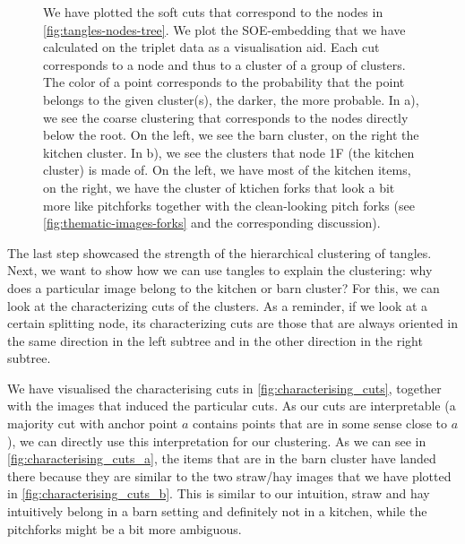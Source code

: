 \onecolumn
\begin{figure}[ht]
    \centering
    \hfill
    \caption{
        We have plotted the soft cuts that correspond to the nodes in \autoref{fig:tangles-nodes-tree}. We plot the SOE-embedding that we
        have calculated on the triplet data as a visualisation aid. Each cut corresponds to a node and thus to a cluster
        of a group of clusters. The color of a point corresponds to the probability that
        the point belongs to the given cluster(s), the darker, the more probable. 
        In a), we see the coarse clustering that corresponds to the nodes directly below the root. On the left, we see the barn cluster, 
        on the right the kitchen cluster. In b), we see the clusters that node 1F (the kitchen cluster) is made of. On the left, we have
        most of the kitchen items, on the right, we have the cluster of ktichen forks that look a bit more like pitchforks together with the clean-looking
        pitch forks (see \autoref{fig:thematic-images-forks} and the corresponding discussion).
    }
    \label{fig:soft-clustering}
\end{figure}

The last step showcased the strength of the hierarchical clustering of tangles. Next, we want to show how we can use tangles to explain the clustering:
why does a particular image belong to the kitchen or barn cluster? For this, we can look at the characterizing cuts of the clusters. As a reminder, if we look at a certain splitting node, its characterizing cuts are those that are always oriented in the same direction in the left subtree and in the other direction in the right subtree. 

We have visualised the characterising cuts in \autoref{fig:characterising_cuts}, together with the images that induced the particular cuts. As our cuts are interpretable (a majority cut 
with anchor point $a$ contains points that are in some sense close to $a$), we can directly use this interpretation for our clustering. As we can see in \autoref{fig:characterising_cuts_a}, 
the items that are in the barn cluster have landed there because they are similar to the two straw/hay images that we have plotted in \autoref{fig:characterising_cuts_b}. This is similar to our intuition, straw and hay intuitively belong 
in a barn setting and definitely not in a kitchen, while the pitchforks might be a bit more ambiguous.

